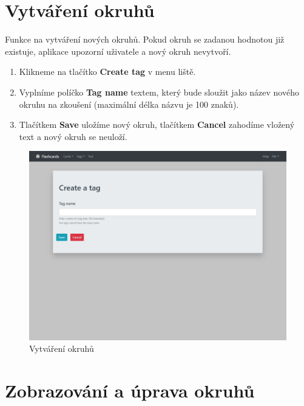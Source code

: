 \documentclass[11pt]{article}
\providecommand{\tightlist}{\setlength{\itemsep}{1pt}\setlength{\parskip}{1pt}}
\begin{document}
\hypertarget{vytvuxe1ux159enuxed-okruhux16f}{%
\section{Vytváření okruhů}\label{vytvuxe1ux159enuxed-okruhux16f}}

Funkce na vytváření nových okruhů. Pokud okruh se zadanou hodnotou již
existuje, aplikace upozorní uživatele a nový okruh nevytvoří.

\begin{enumerate}
\def\labelenumi{\arabic{enumi}.}
\tightlist
\item
  Klikneme na tlačítko \textbf{Create tag} v menu liště.
\item
  Vyplníme políčko \textbf{Tag name} textem, který bude sloužit jako
  název nového okruhu na zkoušení (maximální délka názvu je 100 znaků).
\item
  Tlačítkem \textbf{Save} uložíme nový okruh, tlačítkem \textbf{Cancel}
  zahodíme vložený text a nový okruh se neuloží.
\end{enumerate}

\begin{figure}
\centering
\includegraphics{assets/create_tag.jpg}
\caption{Vytváření okruhů}
\end{figure}

\hypertarget{zobrazovuxe1nuxed-a-uxfaprava-okruhux16f}{%
\section{Zobrazování a úprava
okruhů}\label{zobrazovuxe1nuxed-a-uxfaprava-okruhux16f}}
\end{document}
